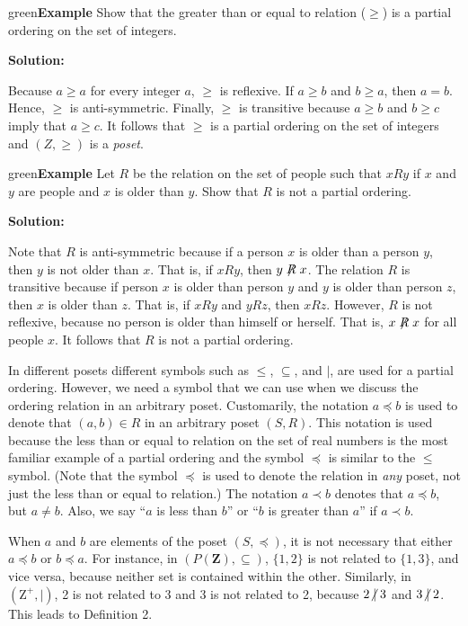 \documentclass[11pt]{article}
\newenvironment{example}[1][\unskip]{\begin{mybox}{green}{\textbf{Example} {#1}}}{\end{mybox}}
\begin{document}
\begin{example}
Show that the greater than or equal to relation ($\geq$) is a partial ordering on the set of integers.

\textbf{Solution:} 

Because $a \geq a$ for every integer $a$, $\geq$ is reflexive. If $a \geq b$ and $b \geq a$, then $a = b$. Hence, $\geq$ is anti-symmetric. Finally, $\geq$ is transitive because $a \geq b$ and $b \geq c$ imply that $a \geq c$. It follows that $\geq$ is a partial ordering on the set of integers and $(Z, \geq)$ is a \textit{poset}.
\end{example}

\begin{example}
Let $R$ be the relation on the set of people such that $xRy$ if $x$ and $y$ are people and $x$ is older than $y$. Show that $R$ is not a partial ordering.

\textbf{Solution:}

Note that $R$ is anti-symmetric because if a person $x$ is older than a person $y$, then $y$ is not older than $x$. That is, if $xRy$, then $y\centernot{R}x$. The relation $R$ is transitive because if person $x$ is older than person $y$ and $y$ is older than person $z$, then $x$ is older than $z$. That is, if $xRy$ and $yRz$, then $xRz$. However, $R$ is not reflexive, because no person is older than himself or herself. That is, $x \centernot{R} x$ for all people $x$. It follows that $R$ is not a partial ordering.
\end{example}

In different posets different symbols such as $\leq$, $\subseteq$, and $|$, are used for a partial ordering. However, we need a symbol that we can use when we discuss the ordering relation in an arbitrary poset. Customarily, the notation $a \preceq b$ is used to denote that $(a, b) \in R$ in an arbitrary poset $(S, R)$. This notation is used because the less than or equal to relation on the set of real numbers is the most familiar example of a partial ordering and the symbol $\preceq$ is similar to the $\leq$ symbol. (Note that the symbol $\preceq$ is used to denote the relation in \textit{any} poset, not just the less than or equal to relation.) The notation $a \prec b$ denotes that $a \preceq b$, but $a \neq b$. Also, we say “$a$ is less than $b$” or “$b$ is greater than $a$” if $a \prec b$. 

When $a$ and $b$ are elements of the poset $(S, \preceq)$, it is not necessary that either $a \preceq b$ or $b \preceq a$. For instance, in $(P(\textbf{Z}), \subseteq)$, $\{1, 2\}$ is not related to $\{1, 3\}$, and vice versa, because neither set is contained within the other. Similarly, in $(\text{Z}^+, |)$, 2 is not related to 3 and 3 is not related to 2, because $2 \centernot{|} 3$ and $3 \centernot{|} 2$. This leads to Definition 2.
\end{document}

